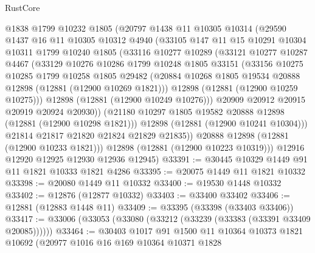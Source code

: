 \begin{lexlean}{RustCore}
\begin{coremodule}
          @1838
          @1799
          @10232
          @1805
          (@20797
            @1438
            @11
            @10305
            @10314
            (@29590
              @1437
              @16
              @11
              @10305
              @10312
              @4940
              (@33105
                @147
                @11
                @15
                @10291
                @10304
                @10311
                @1799
                @10240
                @1805
                (@33116
                  @10277
                  @10289
                  (@33121
                    @10277
                    @10287
                    @4467
                    (@33129
                      @10276
                      @10286
                      @1799
                      @10248
                      @1805
                      @33151
                      (@33156
                        @10275
                        @10285
                        @1799
                        @10258
                        @1805
                        @29482
                        (@20884 @10268 @1805 @19534 @20888 @12898 (@12881 (@12900 @10269 @1821)))
                        @12898
                        (@12881 (@12900 @10259 @10275)))
                      @12898
                      (@12881 (@12900 @10249 @10276)))
                    @20909
                    @20912
                    @20915
                    @20919
                    @20924
                    @20930))
                (@21180 @10297 @1805 @19582 @20888 @12898 (@12881 (@12900 @10298 @1821)))
                @12898
                (@12881 (@12900 @10241 @10304)))
              @21814
              @21817
              @21820
              @21824
              @21829
              @21835))
          @20888
          @12898
          (@12881 (@12900 @10233 @1821)))
        @12898
        (@12881 (@12900 @10223 @10319)))
      @12916
      @12920
      @12925
      @12930
      @12936
      @12945)
@33391 := @30445 @10329 @1449 @91 @11 @1821 @10333 @1821 @4286
@33395 := @20075 @1449 @11 @1821 @10332
@33398 := @20080 @1449 @11 @10332
@33400 := @19530 @1448 @10332
@33402 := @12876 (@12877 @10332)
@33403 := @33400 @33402
@33406 := @12881 (@12883 @1448 @11)
@33409 := @33395 (@33398 (@33403 @33406))
@33417 := @33006 (@33053 (@33080 (@33212 (@33239 (@33383 (@33391 @33409 @20085))))))
@33464 := @30403
    @1017
    @91
    @1500
    @11
    @10364
    @10373
    @1821
    @10692
    (@20977
      @1016
      @16
      @169
      @10364
      @10371
      @1828

\end{coremodule}
\end{lexlean}
